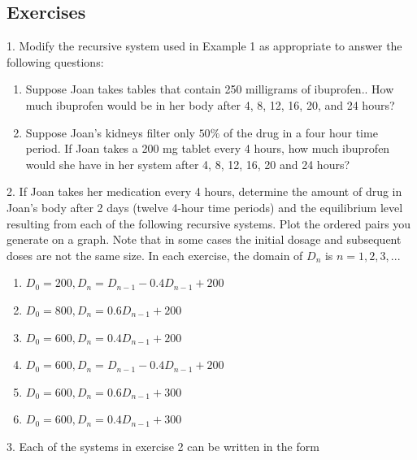 \documentclass[10pt,]{book}
\theoremstyle{plain}
\theoremstyle{definition}
\theoremstyle{definition}
\theoremstyle{definition}
\numberwithin{equation}{section}
\begin{document}
\subsection[{Exercises}]{Exercises}\label{exercises-2}
\begin{exerciselist}
\item[1.]\hypertarget{exercise-3}{}Modify the recursive  system  used in Example 1 as appropriate to answer the following questions: \leavevmode%
\begin{enumerate}[label=(\alph*)]
\item\hypertarget{li-7}{}Suppose Joan takes tables that contain 250 milligrams of ibuprofen..  How much ibuprofen would be in her body after 4, 8, 12, 16, 20, and 24 hours?%
\item\hypertarget{li-8}{}Suppose Joan’s kidneys filter only \(50\%\) of the drug in a four hour time period.  If Joan takes a 200 mg tablet every 4 hours, how much ibuprofen would she  have in her system after  4, 8, 12, 16, 20 and 24 hours?%
\end{enumerate}
%
\par\smallskip
\item[2.]\hypertarget{exercise-4}{}If Joan takes her medication every 4 hours, determine the amount of drug in Joan’s body after 2 days (twelve  4-hour time periods) and the equilibrium level resulting from each of the following recursive systems.  Plot the ordered pairs you generate on a graph.  Note that in some cases the initial dosage and subsequent doses are not the same size.  In each exercise, the domain of \(D_n\) is \(n=1,2,3, ...\) \leavevmode%
\begin{enumerate}[label=(\alph*)]
\item\hypertarget{li-9}{}\(D_0=200, D_n=D_{n-1} - 0.4D_{n-1} + 200\)%
\item\hypertarget{li-10}{}\(D_0=800, D_n=0.6D_{n-1} + 200\)%
\item\hypertarget{li-11}{}\(D_0=600, D_n=0.4D_{n-1} + 200\)%
\item\hypertarget{li-12}{}\(D_0=600, D_n=D_{n-1} - 0.4D_{n-1} + 200\)%
\item\hypertarget{li-13}{}\(D_0=600, D_n=0.6D_{n-1} + 300\)%
\item\hypertarget{li-14}{}\(D_0=600, D_n=0.4D_{n-1} + 300\)%
\end{enumerate}
%
\par\smallskip
\item[3.]\hypertarget{exercise-5}{}Each of the systems in exercise 2 can be written in the form%
\begin{gather*}

\end{gather*}
\end{exerciselist}
\end{document}
